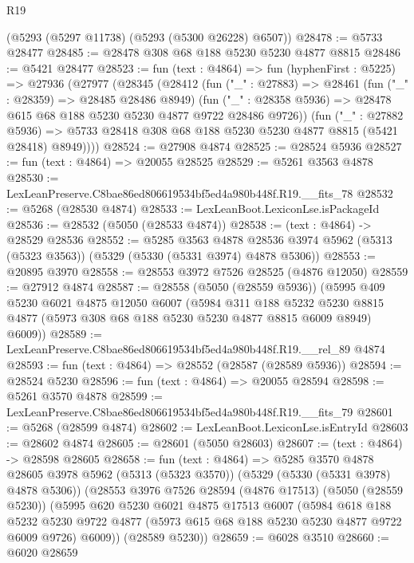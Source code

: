 \begin{lexlean}{R19}
\begin{coremodule}
    (@5293 (@5297 @11738) (@5293 (@5300 @26228) @6507))
@28478 := @5733 @28477
@28485 := @28478 @308 @68 @188 @5230 @5230 @4877 @8815
@28486 := @5421 @28477
@28523 := fun (text : @4864) =>
  fun (hyphenFirst : @5225) =>
  @27936
    (@27977
      (@28345
        (@28412
          (fun ("_" : @27883) =>
          @28461
            (fun ("_" : @28359) => @28485 @28486 @8949)
            (fun ("_" : @28358 @5936) => @28478 @615 @68 @188 @5230 @5230 @4877 @9722 @28486 @9726))
          (fun ("_" : @27882 @5936) =>
          @5733 @28418 @308 @68 @188 @5230 @5230 @4877 @8815 (@5421 @28418) @8949))))
@28524 := @27908 @4874
@28525 := @28524 @5936
@28527 := fun (text : @4864) => @20055 @28525
@28529 := @5261 @3563 @4878
@28530 := LexLeanPreserve.C8bae86ed806619534bf5ed4a980b448f.R19.__fits_78
@28532 := @5268 (@28530 @4874)
@28533 := LexLeanBoot.LexiconLse.isPackageId
@28536 := @28532 (@5050 (@28533 @4874))
@28538 := (text : @4864) -> @28529 @28536
@28552 := @5285
    @3563
    @4878
    @28536
    @3974
    @5962
    (@5313 (@5323 @3563))
    (@5329 (@5330 (@5331 @3974) @4878 @5306))
@28553 := @20895 @3970
@28558 := @28553 @3972 @7526 @28525 (@4876 @12050)
@28559 := @27912 @4874
@28587 := @28558
    (@5050 (@28559 @5936))
    (@5995
      @409
      @5230
      @6021
      @4875
      @12050
      @6007
      (@5984
        @311
        @188
        @5232
        @5230
        @8815
        @4877
        (@5973 @308 @68 @188 @5230 @5230 @4877 @8815 @6009 @8949)
        @6009))
@28589 := LexLeanPreserve.C8bae86ed806619534bf5ed4a980b448f.R19.__rel_89 @4874
@28593 := fun (text : @4864) => @28552 (@28587 (@28589 @5936))
@28594 := @28524 @5230
@28596 := fun (text : @4864) => @20055 @28594
@28598 := @5261 @3570 @4878
@28599 := LexLeanPreserve.C8bae86ed806619534bf5ed4a980b448f.R19.__fits_79
@28601 := @5268 (@28599 @4874)
@28602 := LexLeanBoot.LexiconLse.isEntryId
@28603 := @28602 @4874
@28605 := @28601 (@5050 @28603)
@28607 := (text : @4864) -> @28598 @28605
@28658 := fun (text : @4864) =>
  @5285
    @3570
    @4878
    @28605
    @3978
    @5962
    (@5313 (@5323 @3570))
    (@5329 (@5330 (@5331 @3978) @4878 @5306))
    (@28553
      @3976
      @7526
      @28594
      (@4876 @17513)
      (@5050 (@28559 @5230))
      (@5995
        @620
        @5230
        @6021
        @4875
        @17513
        @6007
        (@5984
          @618
          @188
          @5232
          @5230
          @9722
          @4877
          (@5973 @615 @68 @188 @5230 @5230 @4877 @9722 @6009 @9726)
          @6009))
      (@28589 @5230))
@28659 := @6028 @3510
@28660 := @6020 @28659

\end{coremodule}
\end{lexlean}
